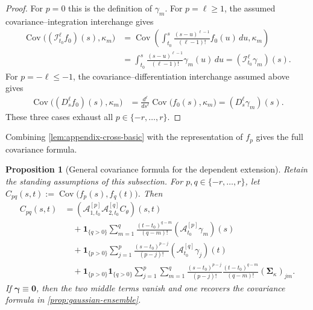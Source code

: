\documentclass[11pt,a4paper]{article}
\newtheorem{proposition}{Proposition}
\theoremstyle{definition}
\theoremstyle{remark}
\DeclareMathOperator{\Cov}{Cov}
\begin{document}
\begin{proof}
For $p=0$ this is the definition of $\gamma_m$. For \(p=\ell\geq 1\), the assumed covariance--integration interchange gives
\begin{align*}
\Cov\bigl((\mathcal I_{t_0}^{\ell}f_0)(s),\kappa_m\bigr)
&=\Cov\left(\int_{t_0}^{s}\frac{(s-u)^{\ell-1}}{(\ell-1)!}f_0(u)\,du,\kappa_m\right)\\
&=\int_{t_0}^{s}\frac{(s-u)^{\ell-1}}{(\ell-1)!}\gamma_m(u)\,du
=(\mathcal I_{t_0}^{\ell}\gamma_m)(s).
\end{align*}
For $p=-\ell\leq -1$, the covariance--differentiation interchange assumed above gives
\begin{align*}
\Cov\bigl((D_s^{\ell}f_0)(s),\kappa_m\bigr)
&=\frac{d^\ell}{ds^\ell}\Cov\bigl(f_0(s),\kappa_m\bigr)
=(D_s^{\ell}\gamma_m)(s).
\end{align*}
These three cases exhaust all $p\in\{-r,\ldots,r\}$.
\end{proof}

Combining \cref{lem:appendix-cross-basic} with the representation of \(f_p\) gives the full covariance formula.

\begin{proposition}[General covariance formula for the dependent extension]\label{thm:appendix-general-cov}
Retain the standing assumptions of this subsection. For \(p,q\in\{-r,\ldots,r\}\), let \(C_{pq}(s,t):=\Cov\bigl(f_p(s),f_q(t)\bigr)\). Then
\begin{align*}
C_{pq}(s,t)
&=(\mathcal A_{1,t_0}^{[p]}\mathcal A_{2,t_0}^{[q]}C_\theta)(s,t)\\
&\quad+\mathbf{1}_{\{q>0\}}\sum_{m=1}^{q}\frac{(t-t_0)^{q-m}}{(q-m)!}(\mathcal A_{t_0}^{[p]}\gamma_m)(s)\\
&\quad+\mathbf{1}_{\{p>0\}}\sum_{j=1}^{p}\frac{(s-t_0)^{p-j}}{(p-j)!}(\mathcal A_{t_0}^{[q]}\gamma_j)(t)\\
&\quad+\mathbf{1}_{\{p>0\}}\mathbf{1}_{\{q>0\}}\sum_{j=1}^{p}\sum_{m=1}^{q}
\frac{(s-t_0)^{p-j}}{(p-j)!}\frac{(t-t_0)^{q-m}}{(q-m)!}(\boldsymbol{\Sigma}_{\kappa})_{jm}.
\end{align*}
If $\boldsymbol{\gamma}\equiv \mathbf{0}$, then the two middle terms vanish and one recovers the covariance formula in \cref{prop:gaussian-ensemble}.
\end{proposition}
\end{document}
